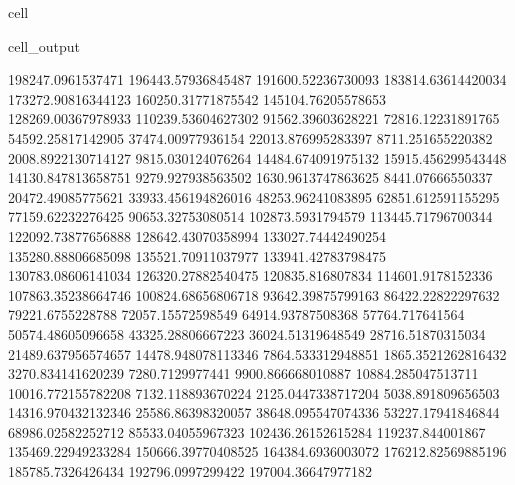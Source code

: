 \documentclass[letterpaper,10pt,english]{jupyterBook}
\begin{document}
\begin{sphinxuseclass}{cell}
\begin{sphinxVerbatimOutput}
\begin{sphinxuseclass}{cell_output}
\begin{sphinxVerbatim}[commandchars=\\\{\}]
198247.0961537471  196443.57936845487  191600.52236730093  183814.63614420034  173272.90816344123  160250.31771875542  145104.76205578653  128269.00367978933  110239.53604627302  91562.39603628221  72816.12231891765  54592.25817142905  37474.00977936154  22013.876995283397  8711.251655220382  \PYGZhy{}2008.8922130714127  \PYGZhy{}9815.030124076264  \PYGZhy{}14484.674091975132  \PYGZhy{}15915.456299543448  \PYGZhy{}14130.847813658751  \PYGZhy{}9279.927938563502  \PYGZhy{}1630.9613747863625  8441.07666550337  20472.49085775621  33933.456194826016  48253.96241083895  62851.612591155295  77159.62232276425  90653.32753080514  102873.5931794579  113445.71796700344  122092.73877656888  128642.43070358994  133027.74442490254  135280.88806685098  135521.70911037977  133941.42783798475  130783.08606141034  126320.27882540475  120835.816807834  114601.9178152336  107863.35238664746  100824.68656806718  93642.39875799163  86422.22822297632  79221.6755228788  72057.15572598549  64914.93787508368  57764.717641564  50574.48605096658  43325.28806667223  36024.51319648549  28716.51870315034  21489.637956574657  14478.948078113346  7864.533312948851  1865.3521262816432  \PYGZhy{}3270.834141620239  \PYGZhy{}7280.7129977441  \PYGZhy{}9900.866668010887  \PYGZhy{}10884.285047513711  \PYGZhy{}10016.772155782208  \PYGZhy{}7132.118893670224  \PYGZhy{}2125.0447338717204  5038.891809656503  14316.970432132346  25586.86398320057  38648.095547074336  53227.17941846844  68986.02582252712  85533.04055967323  102436.26152615284  119237.844001867  135469.22949233284  150666.39770408525  164384.6936003072  176212.82569885196  185785.7326426434  192796.0997299422  197004.36647977182  

\end{sphinxVerbatim}
\end{sphinxuseclass}
\end{sphinxVerbatimOutput}
\end{sphinxuseclass}
\end{document}
